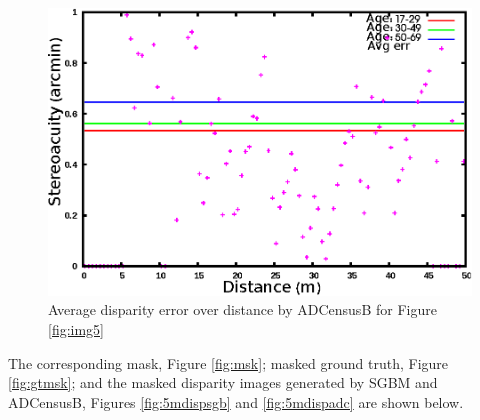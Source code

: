 \begin{figure}[H]
\centering
\includegraphics[scale=0.95]{adcimg5pix3msk}
\caption{Average disparity error over distance by ADCensusB for Figure \protect\ref{fig:img5}}
\label{fig:imgfull5}
\end{figure}

\noindent
The corresponding mask, Figure \ref{fig:msk}; masked ground truth, Figure \ref{fig:gtmsk}; and
the masked disparity images generated by SGBM and ADCensusB, Figures \ref{fig:5mdispsgb} and \ref{fig:5mdispadc} 
are shown below.

